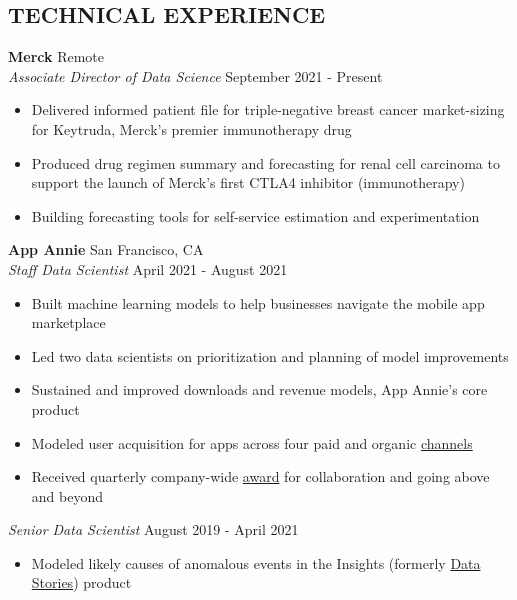 \documentclass[line,margin,10pt]{res}
\begin{document}
\begin{resume}
\section{TECHNICAL EXPERIENCE}
\textbf{Merck} \hfill Remote\\
{\sl Associate Director of Data Science} \hfill September 2021 - Present
\begin{itemize} \itemsep -2pt
	\item Delivered informed patient file for triple-negative breast cancer market-sizing for Keytruda, Merck's premier immunotherapy drug
	\item Produced drug regimen summary and forecasting for renal cell carcinoma to support the launch of Merck's first CTLA4 inhibitor (immunotherapy)
	\item Building forecasting tools for self-service estimation and experimentation
\end{itemize}
{\vspace{-0.25cm}}
\textbf{App Annie} \hfill San Francisco, CA\\
{\sl Staff  Data Scientist} \hfill April 2021 - August 2021
\begin{itemize} \itemsep -2pt
\item Built machine learning models to help businesses navigate the mobile app marketplace
\item Led two data scientists on prioritization and planning of model improvements
\item Sustained and improved downloads and revenue models, App Annie's core product
\item Modeled user acquisition for apps across four paid and organic \href{https://www.appannie.com/en/insights/product-announcements/understand-paid-vs-organic-downloads-with-improved-download-channel-report/}{channels}
\item Received quarterly company-wide \href{https://www.linkedin.com/pulse/meet-abbie-popa-staff-data-scientist-from-our-amer-region-thomas/?trackingId=BPJh%2B6dFR%2Baz%2BUpkpGznRA%3D%3D}{award} for collaboration and going above and beyond
\end{itemize}
{\vspace{-0.25cm}}
{\sl Senior Data Scientist} \hfill August 2019 - April 2021
\begin{itemize} \itemsep -2pt
\item Modeled likely causes of anomalous events in the Insights (formerly \href{https://www.appannie.com/en/insights/product-announcements/data-stories-labs/}{Data Stories}) product

\end{itemize}
\end{resume}
\end{document}
